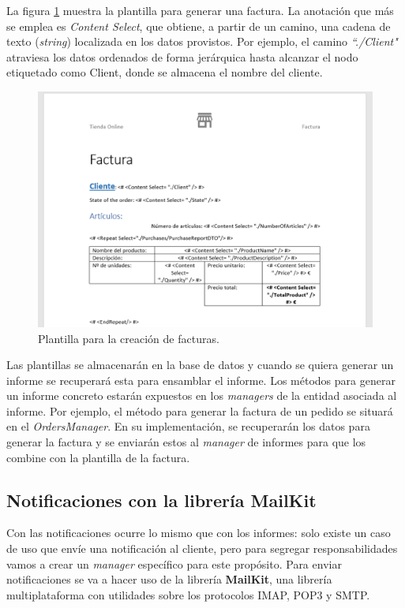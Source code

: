 \documentclass[11pt,spanish,listoffigures]{tfgetsinf}
\begin{document}
La figura \ref{fig:Factura} muestra la plantilla para generar una factura. La anotación que más se emplea es \textit{Content Select}, que obtiene, a partir de un camino, una cadena de texto (\textit{string}) localizada en los datos provistos. Por ejemplo, el camino \textit{``./Client"} atraviesa los datos ordenados de forma jerárquica hasta alcanzar el nodo etiquetado como Client, donde se almacena el nombre del cliente.

\begin{figure}[h]
\centering
\includegraphics[scale=0.5]{Factura}
\caption{Plantilla para la creación de facturas.}
\label{fig:Factura}
\end{figure}

Las plantillas se almacenarán en la base de datos y cuando se quiera generar un informe se recuperará esta para ensamblar el informe. Los métodos para generar un informe concreto estarán expuestos en los \textit{managers} de la entidad asociada al informe. Por ejemplo, el método para generar la factura de un pedido se situará en el \textit{OrdersManager}. En su implementación, se recuperarán los datos para generar la factura y se enviarán estos al \textit{manager} de informes para que los combine con la plantilla de la factura.

\newpage

\subsection{Notificaciones con la librería MailKit}

Con las notificaciones ocurre lo mismo que con los informes: solo existe un caso de uso que envíe una notificación al cliente, pero para segregar responsabilidades vamos a crear un \textit{manager} específico para este propósito. Para enviar notificaciones se va a hacer uso de la librería \textbf{MailKit}, una librería multiplataforma con utilidades sobre los protocolos IMAP, POP3 y SMTP.
\end{document}
